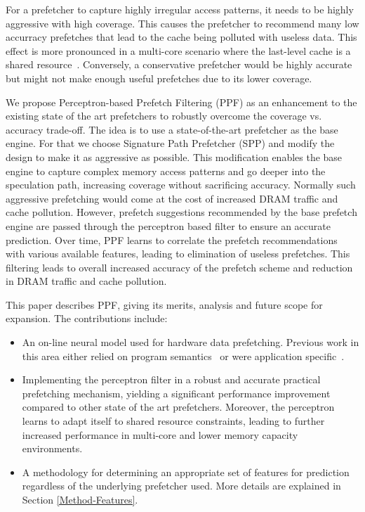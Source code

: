 For a prefetcher to capture highly irregular access patterns, it needs to be
highly aggressive with high coverage. This causes the prefetcher to recommend many
low accurracy prefetches that lead to the cache being polluted with useless data.  
This effect is more pronounced in a multi-core scenario where the last-level cache is a
shared resource~\cite{Friendly}.  Conversely, a conservative prefetcher would
be highly accurate but might not make enough useful prefetches due to its lower coverage.

We propose Perceptron-based Prefetch Filtering (PPF) as an enhancement to
the existing state of the art prefetchers to robustly overcome the coverage
vs. accuracy trade-off.  The idea is to use a state-of-the-art prefetcher as
the base engine. For that we choose Signature Path Prefetcher (SPP) and
modify the design to make it as aggressive as possible.  This modification
enables the base engine to capture complex memory access patterns and go
deeper into the speculation path, increasing coverage without sacrificing accuracy. 
Normally such aggressive prefetching would come at the cost of increased DRAM traffic
and cache pollution. However, prefetch suggestions recommended by the base prefetch
engine are passed through the perceptron based filter to ensure an accurate prediction.
Over time, PPF learns to correlate the prefetch recommendations with various available
features, leading to elimination of useless prefetches. This filtering leads
to overall increased accuracy of the prefetch scheme and reduction in DRAM
traffic and cache pollution.

\vspace{1ex}This paper describes PPF, giving its merits, analysis and
future scope for expansion. The contributions include:

\begin{itemize}

\item An on-line neural model used for hardware data
  prefetching.  Previous work in this area either relied on program
  semantics~\cite{Semantics} or were application specific~\cite{Datacenter}.

\item Implementing the perceptron filter in a robust and accurate
  practical prefetching mechanism, yielding a significant performance
  improvement compared to other state of the art prefetchers.
  Moreover, the perceptron learns to adapt itself to shared resource
  constraints, leading to further increased performance in multi-core and
  lower memory capacity environments.

\item A methodology for determining an appropriate set of 
  features for prediction regardless of the underlying prefetcher used.
  More details are explained in Section \ref{Method-Features}.

\end{itemize}

